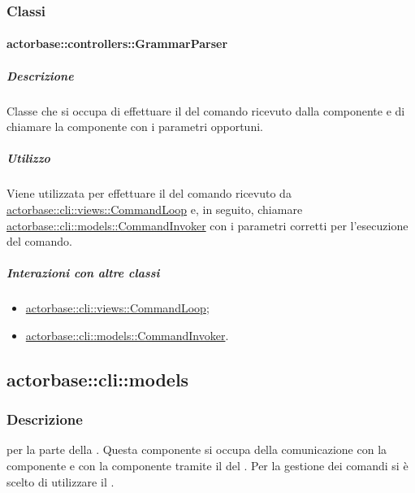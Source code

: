 \documentclass{scalatekids-article}
\begin{document}
\subsubsection{Classi}

\paragraph{actorbase::controllers::GrammarParser}
\label{sec:actorbase::controllers::GrammarParser}

\subparagraph{Descrizione}

Classe che si occupa di effettuare il  del comando ricevuto
dalla componente  e di chiamare la componente  con i
parametri opportuni.

\subparagraph{Utilizzo}

Viene utilizzata per effettuare il  del comando ricevuto da
\hyperref[sec:actorbase::cli::views::CommandLoop]{actorbase::cli::views::CommandLoop} e, in seguito, chiamare
\hyperref[sec:actorbase::cli::models::CommandInvoker]{actorbase::cli::models::CommandInvoker} con i parametri corretti per
l'esecuzione del comando.

\subparagraph{Interazioni con altre classi}

\begin{itemize}
\item \hyperref[sec:actorbase::cli::views::CommandLoop]{actorbase::cli::views::CommandLoop};
\item \hyperref[sec:actorbase::cli::models::CommandInvoker]{actorbase::cli::models::CommandInvoker}.
\end{itemize}

\subsection{actorbase::cli::models}
\label{sec:actorbase::cli::models}

\subsubsection{Descrizione}

 per la parte  della . Questa
componente si occupa della comunicazione con la componente  e
con la componente  tramite il  del  . Per la gestione dei comandi si è scelto di
utilizzare il .
\end{document}
